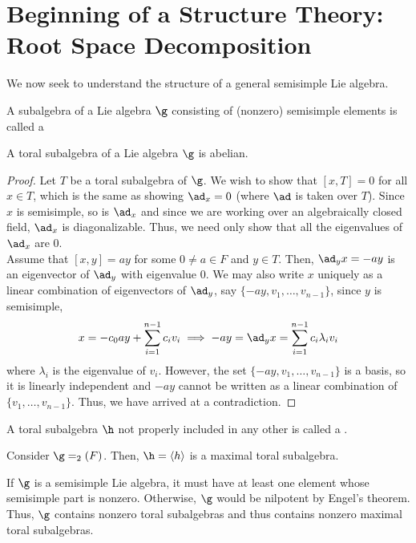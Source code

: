 \documentclass[11pt,leqno,oneside]{amsart}
\numberwithin{thm}{section}
\begin{document}
\section{Beginning of a Structure Theory: Root Space Decomposition}
We now seek to understand the structure of a general semisimple Lie
algebra. 
\begin{defn}
  A subalgebra of a Lie algebra \(\g\) consisting of
  (nonzero) semisimple elements is called a 
\end{defn}
\begin{lem}
  A toral subalgebra of a Lie algebra \(\g\) is abelian.
\end{lem}
\begin{proof}
  Let \(T\) be a toral subalgebra of \(\g\). We wish to show that
  \([x,T] = 0\) for all \(x \in T\), which is the same as showing
  \(\ad_x = 0\) (where \(\ad\) is taken over \(T\)). Since \(x\) is
  semisimple, so is \(\ad_x\) and 
  since we are working over an algebraically closed field, \(\ad_x\)
  is diagonalizable. Thus, we need only show that all the eigenvalues
  of \(\ad_x\) are \(0\). \\

  Assume that \([x,y] = ay\) for some \(0 \neq a \in F\) and \(y \in
  T\). Then, \(\ad_y x = -ay\) is an eigenvector of \(\ad_y\) with
  eigenvalue \(0\). We may also write \(x\) uniquely as a linear combination of
  eigenvectors of \(\ad_y\), say \(\{-ay, v_1, \ldots, v_{n-1}\}\), since \(y\) is semisimple, \[
    x = -c_0 ay + \sum_{i=1}^{n-1} c_i v_i \implies -ay = \ad_y x = \sum_{i=1}^{n-1}
    c_i \lambda_i v_i
  \]
  where \(\lambda_i\) is the eigenvalue of \(v_i\). However, the set
  \(\{-ay, v_1, \ldots, v_{n-1}\}\) is a basis, so it is linearly
  independent and \(-ay\) cannot be written as a linear combination of
  \(\{v_1, \ldots, v_{n-1}\}\). Thus, we have arrived at a contradiction.
\end{proof}
\begin{defn}
  A toral subalgebra \(\h\) not properly included in any other is called a
  .
\end{defn}
\begin{example}
  Consider \(\g = \sl_2(F)\). Then, \(\h = \langle h \rangle\) is a
  maximal toral subalgebra.
\end{example}
\begin{rmk}
  If \(\g\) is a semisimple Lie algebra, it must have at least one
  element whose semisimple part is nonzero. Otherwise, \(\g\) would be
  nilpotent by Engel's theorem. Thus, \(\g\) contains nonzero toral
  subalgebras and thus contains nonzero maximal toral subalgebras.
\end{rmk}
\end{document}

